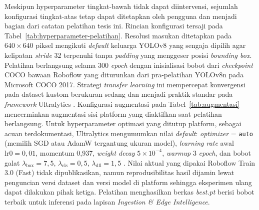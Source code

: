 Meskipun hyperparameter tingkat-bawah tidak dapat diintervensi, sejumlah konfigurasi tingkat-atas tetap dapat ditetapkan oleh pengguna dan menjadi bagian dari catatan pelatihan tesis ini. Rincian konfigurasi tersaji pada Tabel~\ref{tab:hyperparameter-pelatihan}. Resolusi masukan ditetapkan pada $640 \times 640$ piksel mengikuti \textit{default} keluarga YOLOv8 yang sengaja dipilih agar kelipatan \textit{stride} 32 terpenuhi tanpa \textit{padding} yang menggeser posisi \textit{bounding box}. Pelatihan berlangsung selama 300 \textit{epoch} dengan inisialisasi bobot dari \textit{checkpoint} COCO bawaan Roboflow yang diturunkan dari pra-pelatihan YOLOv8n pada Microsoft COCO 2017. Strategi \textit{transfer learning} ini mempercepat konvergensi pada dataset kustom berukuran sedang dan menjadi praktik standar pada \textit{framework} Ultralytics \cite{ultralyticsDocs}. Konfigurasi augmentasi pada Tabel~\ref{tab:augmentasi} mencerminkan augmentasi sisi platform yang diaktifkan saat pelatihan berlangsung. Untuk hyperparameter optimasi yang ditutup platform, sebagai acuan terdokumentasi, Ultralytics mengumumkan nilai \textit{default}: \textit{optimizer} = \texttt{auto} (memilih SGD atau AdamW tergantung ukuran model), \textit{learning rate} awal $\text{lr0}=0{,}01$, momentum 0,937, \textit{weight decay} $5 \times 10^{-4}$, \textit{warmup} 3 \textit{epoch}, dan bobot galat $\lambda_{\text{box}}=7{,}5$, $\lambda_{\text{cls}}=0{,}5$, $\lambda_{\text{dfl}}=1{,}5$ \cite{ultralyticsCfg}. Nilai aktual yang dipakai Roboflow Train 3.0 (Fast) tidak dipublikasikan, namun reprodusibilitas hasil dijamin lewat penguncian versi dataset dan versi model di platform sehingga eksperimen ulang dapat dilakukan pihak ketiga. Pelatihan menghasilkan berkas \textit{best.pt} berisi bobot terbaik untuk inferensi pada lapisan \textit{Ingestion \& Edge Intelligence}.

